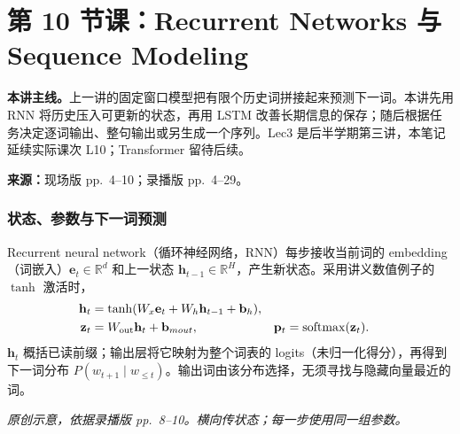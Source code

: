 
\begingroup
\linespread{1.15}\selectfont
\setlength{\parskip}{0.4em}
\renewcommand{\recordid}[1]{}
\renewcommand{\relatedexercise}[2]{\hyperref[exercise:#1]{#2}}
\section{第 10 节课：Recurrent Networks 与 Sequence Modeling}
\label{lecture:SC4002-L10}


\textbf{本讲主线。}上一讲的固定窗口模型把有限个历史词拼接起来预测下一词。本讲先用 RNN 将历史压入可更新的状态，再用 LSTM 改善长期信息的保存；随后根据任务决定逐词输出、整句输出或另生成一个序列。Lec3 是后半学期第三讲，本笔记延续实际课次 L10；Transformer 留待后续。

\nopagebreak[4]
\textbf{来源：}现场版 pp.~4--10；录播版 pp.~4--29。
\nopagebreak[4]

\subsubsection{状态、参数与下一词预测}

Recurrent neural network（循环神经网络，RNN）每步接收当前词的 embedding（词嵌入）$\mathbf e_t\in\mathbb R^d$ 和上一状态 $\mathbf h_{t-1}\in\mathbb R^H$，产生新状态。采用讲义数值例子的 $\tanh$ 激活时，
\begin{align*}
 \mathbf h_t&=\tanh(W_x\mathbf e_t+W_h\mathbf h_{t-1}+\mathbf b_h),\\
 \mathbf z_t&=W_{\rm out}\mathbf h_t+\mathbf b_{
m out},
 &\mathbf p_t&=\operatorname{softmax}(\mathbf z_t).
\end{align*}
$\mathbf h_t$ 概括已读前缀；输出层将它映射为整个词表的 logits（未归一化得分），再得到下一词分布 $P(w_{t+1}\mid w_{\leq t})$。输出词由该分布选择，无须寻找与隐藏向量最近的词。

\begin{center}

\end{center}
{\small\textit{原创示意，依据录播版 pp.~8--10。横向传状态；每一步使用同一组参数。}}

